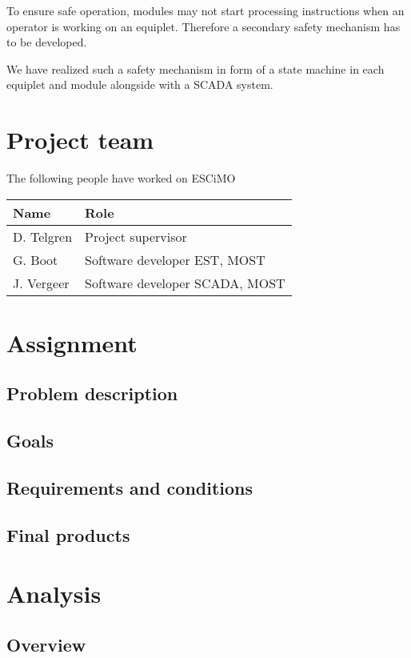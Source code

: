 \documentclass[12pt,a4paper]{report}
\begin{document}
To ensure safe operation, modules may not start processing instructions when an operator is working on an equiplet. Therefore a secondary safety mechanism has to be developed.

We have realized such a safety mechanism in form of a state machine in each equiplet and module alongside with a SCADA system.

\chapter{Project team}
The following people have worked on ESCiMO

\begin{tabular}{l | l}
Name       & Role \\
\hline
D. Telgren & Project supervisor \\
G. Boot    & Software developer EST, MOST \\
J. Vergeer & Software developer SCADA, MOST
\end{tabular}

\chapter{Assignment}

\section{Problem description}

\section{Goals}

\section{Requirements and conditions}

\section{Final products}

\chapter{Analysis}
\section{Overview}
\end{document}
